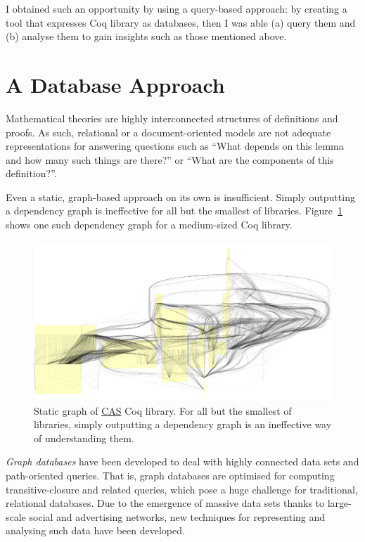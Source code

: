 I obtained such an opportunity by using a query-based approach: by creating a
tool that expresses Coq library as databases, then I was able (a) query them
and (b) analyse them to gain insights such as those mentioned above.

\section{A Database Approach}

Mathematical theories are highly interconnected structures of definitions and
proofs. As such, relational or a document-oriented models are not adequate
representations for answering questions such as ``What depends on this lemma
and how many such things are there?'' or ``What are the components of this
definition?''.

Even a static, graph-based approach on its own is insufficient. Simply
outputting a dependency graph is ineffective for all but the smallest of
libraries. Figure~\ref{fig:static} shows one such dependency graph for a
medium-sized Coq library.

\begin{figure}[tp]

  \centering
  \includegraphics[width=\textwidth, page=1]{img/static-CAS-small.pdf}
  \caption{Static graph of
    \href{https://github.com/Timothy-G-Griffin/CAS}{CAS} Coq library. For all
    but the smallest of libraries, simply outputting a dependency graph is an
    ineffective way of understanding them.}\label{fig:static}

\end{figure}

\emph{Graph databases} have been developed to deal with highly connected data
sets and path-oriented queries. That is, graph databases are optimised for
computing transitive-closure and related queries, which pose a huge challenge
for traditional, relational databases. Due to the emergence of massive data
sets thanks to large-scale social and advertising networks, new techniques for
representing and analysing such data have been developed.

